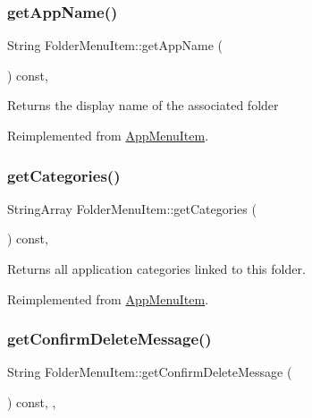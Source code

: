 \subsubsection{\texorpdfstring{get\+App\+Name()}{getAppName()}}
{\footnotesize\ttfamily String Folder\+Menu\+Item\+::get\+App\+Name (\begin{DoxyParamCaption}{ }\end{DoxyParamCaption}) const\hspace{0.3cm}{\ttfamily [override]}, {\ttfamily [virtual]}}

\begin{DoxyReturn}{Returns}
the display name of the associated folder 
\end{DoxyReturn}


Reimplemented from \mbox{\hyperlink{classAppMenuItem_aef18401da6511ac234ccbb2d2131fcad}{App\+Menu\+Item}}.

\mbox{\label{classFolderMenuItem_ae9026a329e1b9e6111354802624328f5}} 
\subsubsection{\texorpdfstring{get\+Categories()}{getCategories()}}
{\footnotesize\ttfamily String\+Array Folder\+Menu\+Item\+::get\+Categories (\begin{DoxyParamCaption}{ }\end{DoxyParamCaption}) const\hspace{0.3cm}{\ttfamily [override]}, {\ttfamily [virtual]}}

\begin{DoxyReturn}{Returns}
all application categories linked to this folder. 
\end{DoxyReturn}


Reimplemented from \mbox{\hyperlink{classAppMenuItem_a4d944a13d50b5156d77d0d735c7a0a90}{App\+Menu\+Item}}.

\mbox{\label{classFolderMenuItem_ae1961598036e3f731d146257cd556d05}} 
\subsubsection{\texorpdfstring{get\+Confirm\+Delete\+Message()}{getConfirmDeleteMessage()}}
{\footnotesize\ttfamily String Folder\+Menu\+Item\+::get\+Confirm\+Delete\+Message (\begin{DoxyParamCaption}{ }\end{DoxyParamCaption}) const\hspace{0.3cm}{\ttfamily [override]}, {\ttfamily [protected]}, {\ttfamily [virtual]}}


